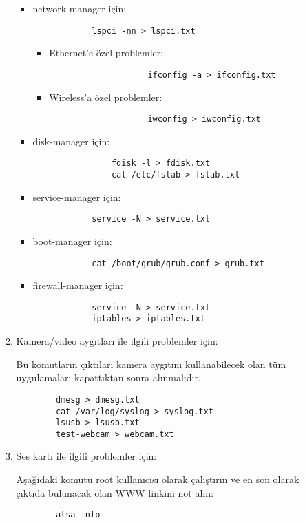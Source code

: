 \documentclass[a4paper,10pt]{article}
\begin{document}
\begin{itemize}
\begin{enumerate}
	\begin{itemize}
		\item  network-manager için:
			\begin{verbatim}
			lspci -nn > lspci.txt
			\end{verbatim}
			\begin{itemize}
  			\item Ethernet'e özel problemler:
				\begin{verbatim}
    				ifconfig -a > ifconfig.txt
				\end{verbatim}
  			\item Wireless'a özel problemler:
				\begin{verbatim}
    				iwconfig > iwconfig.txt
				\end{verbatim}
			\end{itemize}
		\item disk-manager için:
			\begin{verbatim}
		    	fdisk -l > fdisk.txt
    			cat /etc/fstab > fstab.txt
			\end{verbatim}
		\item service-manager için:
			\begin{verbatim}
			service -N > service.txt
			\end{verbatim}
		\item boot-manager için:
			\begin{verbatim}
			cat /boot/grub/grub.conf > grub.txt
			\end{verbatim}
		\item firewall-manager için:
			\begin{verbatim}
			service -N > service.txt
			iptables > iptables.txt
			\end{verbatim}
	\end{itemize}
	\item Kamera/video aygıtları ile ilgili problemler için:
		
		Bu komutların çıktıları kamera aygıtını kullanabilecek olan tüm uygulamaları kapattıktan sonra alınmalıdır.
		\begin{verbatim}
		dmesg > dmesg.txt
		cat /var/log/syslog > syslog.txt
		lsusb > lsusb.txt
		test-webcam > webcam.txt
		\end{verbatim}
	\item Ses kartı ile ilgili problemler için:

		Aşağıdaki komutu root kullanıcısı olarak çalıştırın ve en son olarak çıktıda bulunacak olan WWW linkini not alın:
		\begin{verbatim}
        alsa-info
		\end{verbatim}
	\end{enumerate}
\end{itemize}
\end{document}
